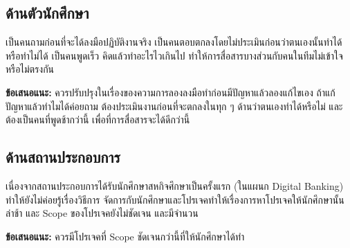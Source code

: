 \subsection{ด้านตัวนักศึกษา}
เป็นคนถามก่อนที่จะได้ลงมือปฏิบัติงานจริง เป็นคนตอบตกลงโดยไม่ประเมินก่อนว่าตนเองนั้นทำได้หรือทำไม่ได้
เป็นคนพูดเร็ว คิดแล้วทำอะไรไวเกินไป ทำให้การสื่อสารบางส่วนกับคนในทีมไม่เข้าใจ หรือไม่ตรงกัน

\noindent \textbf{ข้อเสนอแนะ:} ควรปรับปรุงในเรื่องของความการลองลงมือทำก่อนมีปัญหาแล้วลองแก้ไขเอง 
ถ้าแก้ปัญหาแล้วทำไมได้ค่อยถาม ต้องประเมินงานก่อนที่จะตกลงในทุก ๆ ด้านว่าตนเองทำได้หรือไม่ และต้องเป็นคนที่พูดช้ากว่านี้
เพื่อที่การสื่อสารจะได้ดีกว่านี้

\subsection{ด้านสถานประกอบการ}
เนื่องจากสถานประกอบการได้รับนักศึกษาสหกิจศึกษาเป็นครั้งแรก (ในแผนก Digital Banking) ทำให้ยังไม่ค่อยรู้เรื่องวิธีการ
จัดการกับนักศึกษาและโปรเจคทำให้เรื่องการหาโปรเจคให้นักศึกษานั้นล่าช้า และ Scope ของโปรเจคยังไม่ชัดเจน และมีจำนวน

\noindent \textbf{ข้อเสนอแนะ:} ควรมีโปรเจคที่ Scope ชัดเจนกว่านี้ที่ให้นักศึกษาได้ทำ
